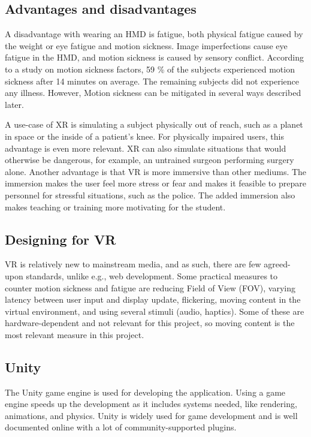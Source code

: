 \documentclass[a4paper]{report}
\begin{document}

\subsection{Advantages and disadvantages}
A disadvantage with wearing an HMD is fatigue, both physical fatigue caused by the weight or eye fatigue and motion sickness\cite{merhi_motion_2007}.
Image imperfections cause eye fatigue in the HMD\cite{kooi_visual_2004}, and motion sickness is caused by sensory conflict.
According to a study on motion sickness factors, 59 \% of the subjects experienced motion sickness after 14 minutes on average. The remaining subjects did not experience any illness\cite{kooi_visual_2004}. However, Motion sickness can be mitigated in several ways described later.


A use-case of XR is simulating a subject physically out of reach, such as a planet in space or the inside of a patient's knee. For physically impaired users, this advantage is even more relevant.
XR can also simulate situations that would otherwise be dangerous, for example, an untrained surgeon performing surgery alone.
Another advantage is that VR is more immersive than other mediums. The immersion makes the user feel more stress or fear and makes it feasible to prepare personnel for stressful situations, such as the police.
The added immersion also makes teaching or training more motivating for the student.\cite{freina_immersive_2015}


\subsection{Designing for VR}
VR is relatively new to mainstream media, and as such, there are few agreed-upon standards, unlike e.g., web development.
Some practical measures to counter motion sickness and fatigue are reducing Field of View (FOV), varying latency between user input and display update, flickering, moving content in the virtual environment, and using several stimuli (audio, haptics)\cite{chang_virtual_2020}. 
Some of these are hardware-dependent and not relevant for this project, so moving content is the most relevant measure in this project.

\subsection{Unity}

The Unity game engine is used for developing the application\cite{technologies_unity_nodate}. Using a game engine speeds up the development as it includes systems needed, like rendering, animations, and physics. Unity is widely used for game development\cite{doucet_game_2021} and is well documented online with a lot of community-supported plugins.
\end{document}
